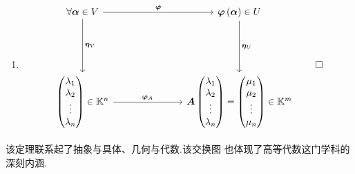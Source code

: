\begin{formal}
\begin{Proof}
\begin{enumerate}[label=\textup{(\arabic*)}]
        $\forall k\in \mathbb{K}$,
        $\left(k\cdot \bm{\varphi}\right)\left(\bm{e}_j\right)=
        k\bm{\varphi}\left(\bm{e}_j\right)$,故
        $\bm{T}\left(k\bm{\varphi}\right)=k\bm{A}=
        k\bm{T}\left(\bm{\varphi}\right)$.

        \item \[
        \begin{tikzcd}
\forall \bm{\alpha} \in V \arrow[rrr, "\bm{\varphi}"] \arrow[ddd, "\bm{\eta}_V"]                                             &  &  & \bm{\varphi}\left(\bm{\alpha}\right)\in U \arrow[ddd, "\bm{\eta}_U"]                                                                                         \\
                                                                                                              &  &  &                                                                                                                                               \\
                                                                                                              &  &  &                                                                                                                                               \\
\begin{pmatrix}\lambda_1\\\lambda_2\\\vdots\\\lambda_n\end{pmatrix} \in \mathbb{K}^n \arrow[rrr, "\bm{\varphi}_A"] &  &  & \bm{A}\begin{pmatrix}\lambda_1\\\lambda_2\\\vdots\\\lambda_n\end{pmatrix}=\begin{pmatrix}\mu_1\\\mu_2\\\vdots\\\mu_n\end{pmatrix} \in \mathbb{K}^m
\end{tikzcd}
\qedhere
    \]
    \end{enumerate}
\end{Proof}
\end{formal}
\begin{red}
\begin{remark}
    该定理联系起了抽象与具体、几何与代数.该交换图
    也体现了高等代数这门学科的深刻内涵.
\end{remark}
\end{red}


